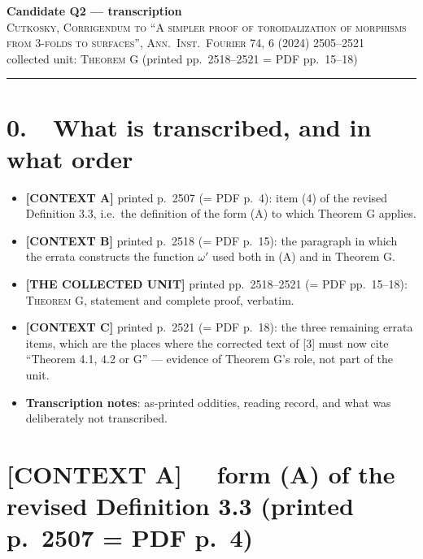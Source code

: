 \documentclass[11pt]{article}
\begin{document}
\begin{center}
{\large\bfseries Candidate Q2 --- transcription}\\[0.3em]
{\scshape Cutkosky, Corrigendum to ``A simpler proof of toroidalization of morphisms\\
from 3-folds to surfaces'', Ann.\ Inst.\ Fourier 74, 6 (2024) 2505--2521}\\[0.3em]
{\small collected unit: \textsc{Theorem G} (printed pp.\ 2518--2521 = PDF pp.\ 15--18)}
\end{center}

\hrule
\vspace{1em}

\section*{0.\ \ What is transcribed, and in what order}

\begin{itemize}\itemsep0.2em
\item \textbf{[CONTEXT A]} printed p.\ 2507 (= PDF p.\ 4): item (4) of the revised
      Definition 3.3, i.e.\ the definition of the form (A) to which Theorem G applies.
\item \textbf{[CONTEXT B]} printed p.\ 2518 (= PDF p.\ 15): the paragraph in which the
      errata constructs the function $\omega'$ used both in (A) and in Theorem G.
\item \textbf{[THE COLLECTED UNIT]} printed pp.\ 2518--2521 (= PDF pp.\ 15--18):
      \textsc{Theorem G}, statement and complete proof, verbatim.
\item \textbf{[CONTEXT C]} printed p.\ 2521 (= PDF p.\ 18): the three remaining errata
      items, which are the places where the corrected text of [3] must now cite
      ``Theorem 4.1, 4.2 or G'' --- evidence of Theorem G's role, not part of the unit.
\item \textbf{Transcription notes}: as-printed oddities, reading record, and what was
      deliberately not transcribed.
\end{itemize}

\section*{[CONTEXT A] \ \ form (A) of the revised Definition 3.3 \quad (printed p.\ 2507 = PDF p.\ 4)}
\end{document}
